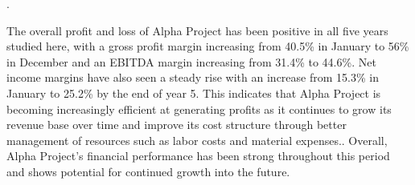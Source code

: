 .

The overall profit and loss of Alpha Project has been positive in all five years studied here, with a gross profit margin increasing from 40.5\% in January to 56\% in December and an EBITDA margin increasing from 31.4\% to 44.6\%. Net income margins have also seen a steady rise with an increase from 15.3\% in January to 25.2\% by the end of year 5. This indicates that Alpha Project is becoming increasingly efficient at generating profits as it continues to grow its revenue base over time and improve its cost structure through better management of resources such as labor costs and material expenses.. Overall, Alpha Project's financial performance has been strong throughout this period and shows potential for continued growth into the future.